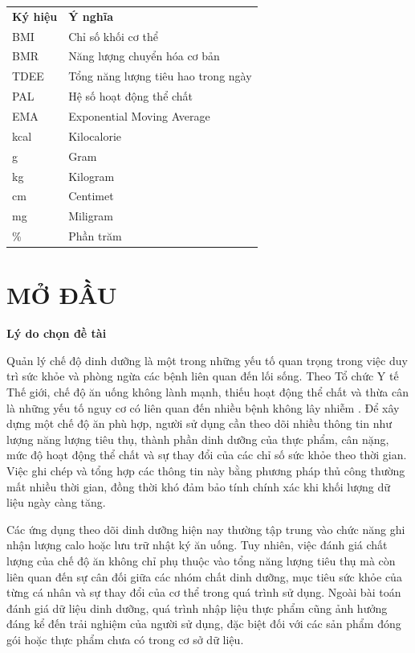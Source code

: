\documentclass[12pt, a4paper]{report}
\begin{document}
\noindent
\begin{tabular}{p{3cm} p{11cm}}
\textbf{Ký hiệu} & \textbf{Ý nghĩa} \\[0.2cm]
BMI & Chỉ số khối cơ thể \\[0.15cm]
BMR & Năng lượng chuyển hóa cơ bản \\[0.15cm]
TDEE & Tổng năng lượng tiêu hao trong ngày \\[0.15cm]
PAL & Hệ số hoạt động thể chất \\[0.15cm]
EMA & Exponential Moving Average \\[0.15cm]
kcal & Kilocalorie \\[0.15cm]
g & Gram \\[0.15cm]
kg & Kilogram \\[0.15cm]
cm & Centimet \\[0.15cm]
mg & Miligram \\[0.15cm]
\% & Phần trăm \\
\end{tabular}
\clearpage
{}

\chapter*{MỞ ĐẦU}
\textbf{Lý do chọn đề tài}

Quản lý chế độ dinh dưỡng là một trong những yếu tố quan trọng trong việc duy trì sức khỏe và phòng ngừa các bệnh liên quan đến lối sống. Theo Tổ chức Y tế Thế giới, chế độ ăn uống không lành mạnh, thiếu hoạt động thể chất và thừa cân là những yếu tố nguy cơ có liên quan đến nhiều bệnh không lây nhiễm \cite{who_healthy_lifestyle}. Để xây dựng một chế độ ăn phù hợp, người sử dụng cần theo dõi nhiều thông tin như lượng năng lượng tiêu thụ, thành phần dinh dưỡng của thực phẩm, cân nặng, mức độ hoạt động thể chất và sự thay đổi của các chỉ số sức khỏe theo thời gian. Việc ghi chép và tổng hợp các thông tin này bằng phương pháp thủ công thường mất nhiều thời gian, đồng thời khó đảm bảo tính chính xác khi khối lượng dữ liệu ngày càng tăng.

Các ứng dụng theo dõi dinh dưỡng hiện nay thường tập trung vào chức năng ghi nhận lượng calo hoặc lưu trữ nhật ký ăn uống. Tuy nhiên, việc đánh giá chất lượng của chế độ ăn không chỉ phụ thuộc vào tổng năng lượng tiêu thụ mà còn liên quan đến sự cân đối giữa các nhóm chất dinh dưỡng, mục tiêu sức khỏe của từng cá nhân và sự thay đổi của cơ thể trong quá trình sử dụng. Ngoài bài toán đánh giá dữ liệu dinh dưỡng, quá trình nhập liệu thực phẩm cũng ảnh hưởng đáng kể đến trải nghiệm của người sử dụng, đặc biệt đối với các sản phẩm đóng gói hoặc thực phẩm chưa có trong cơ sở dữ liệu.
\end{document}
